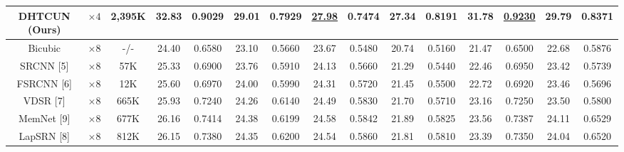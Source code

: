 \documentclass{ieeeaccess}
\begin{document}
\begin{table}
\begin{tabular}{|c|c|c|cc|cc|cc|cc|cc|cc|}
DHTCUN (Ours) & $\times4$  &2,395K& \multicolumn{1}{c|}{\color{red}\textbf{32.83}} &{\color{red}\textbf{0.9029}}  & \multicolumn{1}{c|}{\color{red}\textbf{29.01}} &{\color{red}\textbf{0.7929}}  & \multicolumn{1}{c|}{\color{blue}\underline{27.98}} &{\color{red}\textbf{0.7474}} & \multicolumn{1}{c|}{\color{red}\textbf{27.34 }} &{\color{red}\textbf{0.8191}}  & \multicolumn{1}{c|}{\color{red}\textbf{31.78}} &{\color{blue}\underline{0.9230}} &\multicolumn{1}{c|}{\color{red}\textbf{29.79}} &{\color{red}\textbf{0.8371}}    \\
\hline

Bicubic&$\times8$ &-/-& \multicolumn{1}{c|}{24.40} &0.6580& \multicolumn{1}{c|}{23.10} &0.5660 & \multicolumn{1}{c|}{23.67} &0.5480& \multicolumn{1}{c|}{20.74} &0.5160 & \multicolumn{1}{c|}{21.47} & 0.6500
&\multicolumn{1}{c|}{22.68} & 0.5876     \\

SRCNN [5] & $\times8$ &57K& \multicolumn{1}{c|}{25.33} & 0.6900 & \multicolumn{1}{c|}{23.76} &0.5910 &\multicolumn{1}{c|}{24.13} &0.5660 & \multicolumn{1}{c|}{21.29} &0.5440& \multicolumn{1}{c|}{22.46} &0.6950
&\multicolumn{1}{c|}{23.42} & 0.5739      \\

FSRCNN [6]& $\times8$&12K& \multicolumn{1}{c|}{25.60} &0.6970 & \multicolumn{1}{c|}{24.00} &0.5990&\multicolumn{1}{c|}{24.31} &0.5720 & \multicolumn{1}{c|}{21.45} &0.5500 & \multicolumn{1}{c|}{22.72} & 0.6920
&\multicolumn{1}{c|}{23.46} &  0.5696      \\

VDSR [7]& $\times8$&665K& \multicolumn{1}{c|}{25.93} &0.7240& \multicolumn{1}{c|}{24.26} &0.6140 &\multicolumn{1}{c|}{24.49} &0.5830 & \multicolumn{1}{c|}{21.70} &0.5710 & \multicolumn{1}{c|}{23.16} &0.7250
&\multicolumn{1}{c|}{23.50} & 0.5800       \\

MemNet [9]& $\times8$&677K& \multicolumn{1}{c|}{26.16} &  0.7414 & \multicolumn{1}{c|}{24.38} & 0.6199&\multicolumn{1}{c|}{24.58} & 0.5842 & \multicolumn{1}{c|}{21.89  } &0.5825 & \multicolumn{1}{c|}{23.56 } &0.7387
&\multicolumn{1}{c|}{24.11  } &  0.6529       \\

LapSRN [8]& $\times8$&812K& \multicolumn{1}{c|}{26.15} &0.7380& \multicolumn{1}{c|}{24.35} &0.6200 &\multicolumn{1}{c|}{24.54} &0.5860 & \multicolumn{1}{c|}{21.81} &0.5810 & \multicolumn{1}{c|}{23.39} &0.7350
&\multicolumn{1}{c|}{24.04} & 0.6520       \\


\end{tabular}
\end{table}
\end{document}
